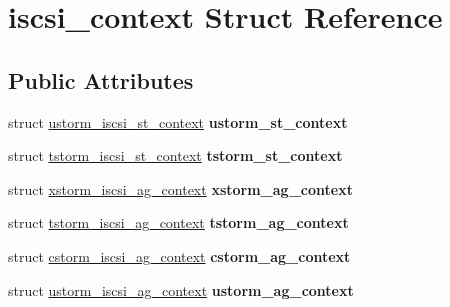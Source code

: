 \hypertarget{structiscsi__context}{
\section{iscsi\_\-context Struct Reference}
\label{structiscsi__context}
}
\subsection*{Public Attributes}
\begin{DoxyCompactItemize}
\item 
\hypertarget{structiscsi__context_a00b9df9c68e63b0eeba33a200646c857}{
struct \hyperlink{structustorm__iscsi__st__context}{ustorm\_\-iscsi\_\-st\_\-context} {\bfseries ustorm\_\-st\_\-context}}
\label{structiscsi__context_a00b9df9c68e63b0eeba33a200646c857}

\item 
\hypertarget{structiscsi__context_a081487ac62201315bbed48edae63a7e3}{
struct \hyperlink{structtstorm__iscsi__st__context}{tstorm\_\-iscsi\_\-st\_\-context} {\bfseries tstorm\_\-st\_\-context}}
\label{structiscsi__context_a081487ac62201315bbed48edae63a7e3}

\item 
\hypertarget{structiscsi__context_aa54503408d5a3a49b5f19a3e4952b2fe}{
struct \hyperlink{structxstorm__iscsi__ag__context}{xstorm\_\-iscsi\_\-ag\_\-context} {\bfseries xstorm\_\-ag\_\-context}}
\label{structiscsi__context_aa54503408d5a3a49b5f19a3e4952b2fe}

\item 
\hypertarget{structiscsi__context_ae168d0bfce13b18bcdd9eadba3ab761b}{
struct \hyperlink{structtstorm__iscsi__ag__context}{tstorm\_\-iscsi\_\-ag\_\-context} {\bfseries tstorm\_\-ag\_\-context}}
\label{structiscsi__context_ae168d0bfce13b18bcdd9eadba3ab761b}

\item 
\hypertarget{structiscsi__context_abffed492e2bf8fabe569c59659ccc5cc}{
struct \hyperlink{structcstorm__iscsi__ag__context}{cstorm\_\-iscsi\_\-ag\_\-context} {\bfseries cstorm\_\-ag\_\-context}}
\label{structiscsi__context_abffed492e2bf8fabe569c59659ccc5cc}

\item 
\hypertarget{structiscsi__context_aa3ea8df252eac9de65ddeda9b86f8d6f}{
struct \hyperlink{structustorm__iscsi__ag__context}{ustorm\_\-iscsi\_\-ag\_\-context} {\bfseries ustorm\_\-ag\_\-context}}
\label{structiscsi__context_aa3ea8df252eac9de65ddeda9b86f8d6f}


\end{DoxyCompactItemize}

